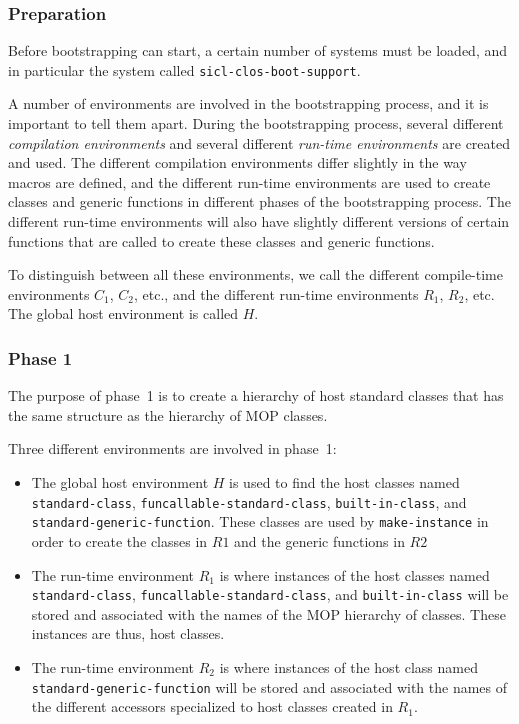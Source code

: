 \subsubsection{Preparation}

Before bootstrapping can start, a certain number of \asdf{} systems
must be loaded, and in particular the system called
\texttt{sicl-clos-boot-support}.

A number of environments are involved in the bootstrapping process,
and it is important to tell them apart.  During the bootstrapping
process, several different \emph{compilation environments} and several
different \emph{run-time environments} are created and used.  The
different compilation environments differ slightly in the way macros
are defined, and the different run-time environments are used to
create classes and generic functions in different phases of the
bootstrapping process.  The different run-time environments will also
have slightly different versions of certain functions that are called
to create these classes and generic functions.

To distinguish between all these environments, we call the different
compile-time environments $C_1$, $C_2$, etc., and the different
run-time environments $R_1$, $R_2$, etc.  The global host environment
is called $H$.

\subsubsection{Phase 1}

The purpose of phase~1 is to create a hierarchy of host standard
classes that has the same structure as the hierarchy of MOP classes.

Three different environments are involved in phase~1:

\begin{itemize}
\item The global host environment $H$ is used to find the host classes
  named \texttt{standard-class}, \texttt{funcallable-standard-class},
  \texttt{built-in-class}, and \texttt{standard-generic-function}.
  These classes are used by \texttt{make-instance} in order to create
  the classes in $R1$ and the generic functions in $R2$
\item The run-time environment $R_1$ is where instances of the host
  classes named \texttt{standard-class},
  \texttt{funcallable-standard-class}, and \texttt{built-in-class}
  will be stored and associated with the names of the MOP hierarchy of
  classes.  These instances are thus, host classes.
\item The run-time environment $R_2$ is where instances of the host
  class named \texttt{standard-generic-function} will be stored and
  associated with the names of the different accessors specialized to
  host classes created in $R_1$.
\end{itemize}

